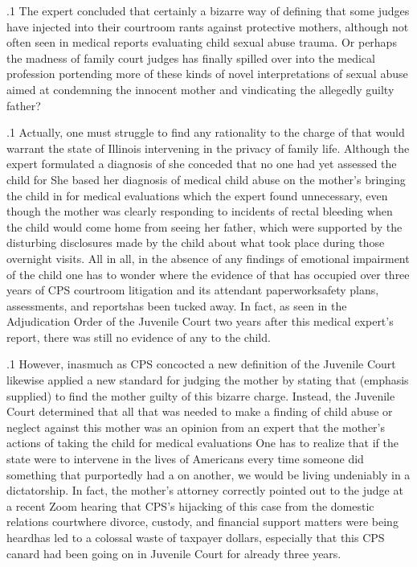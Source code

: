\documentclass[11pt, twoside]{article}
\begin{document}
{\p.1{%
The expert concluded that  \mdash{}certainly a
bizarre way of defining  that some judges have injected
into their courtroom rants against protective mothers, although not often seen in medical reports evaluating child sexual abuse trauma. Or
perhaps the madness of family court judges has finally spilled over into
the medical profession portending more of these kinds of novel interpretations of sexual abuse aimed at condemning the innocent mother
and vindicating the allegedly guilty father?
}%

\p.1{%
Actually, one must struggle to find any rationality to the charge of
 that would warrant the state of Illinois intervening
in the privacy of family life. Although the expert formulated a diagnosis
of  she conceded that no one had yet assessed the
child for  She based her diagnosis of medical
child abuse on the mother's bringing the child in for medical evaluations which the expert found unnecessary, even though the mother was
clearly responding to incidents of rectal bleeding when the child would
come home from seeing her father, which were supported by the disturbing disclosures made by the child about what took place during
those overnight visits. All in all, in the absence of any findings of emotional impairment of the child one has to wonder where the evidence
of  that has occupied over three years of CPS courtroom litigation and its attendant paperwork\mdash{}safety plans, assessments,
and reports\mdash{}has been tucked away. In fact, as seen in the Adjudication
Order of the Juvenile Court two years after this medical expert's report, there was still no evidence of any  to the
child.
}%

\p.1{%
However, inasmuch as CPS concocted a new definition of  the Juvenile Court likewise applied a new standard for judging the mother by stating that  (emphasis
supplied) to find the mother guilty of this bizarre charge. Instead, the
Juvenile Court determined that all that was needed to make a finding
of child abuse or neglect against this mother was an opinion from an
expert that the mother's actions of taking the child for medical evaluations  One has to realize that
if the state were to intervene in the lives of Americans every time someone did something that purportedly had a  on another,
we would be living undeniably in a dictatorship. In fact, the mother's attorney correctly pointed out to the judge at a recent Zoom hearing that
CPS's hijacking of this case from the domestic relations court\mdash{}where
divorce, custody, and financial support matters were being heard\mdash{}has
led to a colossal waste of taxpayer dollars, especially that this CPS
canard had been going on in Juvenile Court for already three years.
}%

}
\end{document}
